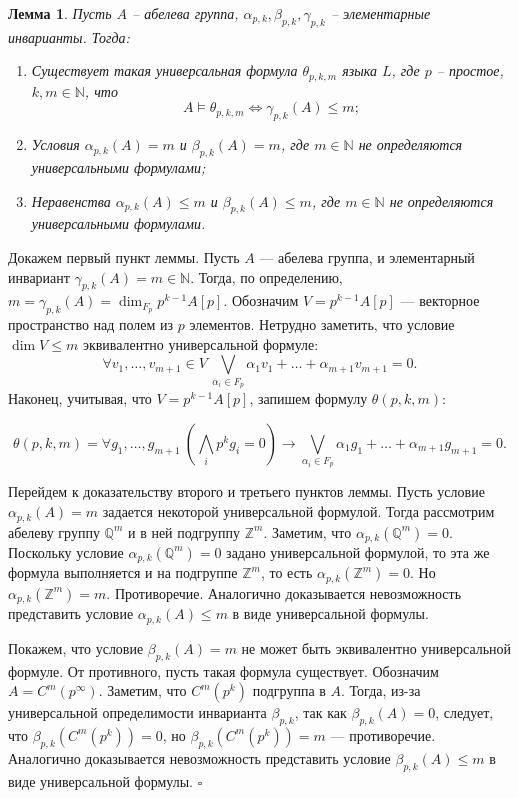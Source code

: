 \documentclass[a4paper,11pt,twoside]{article}
\newtheorem{lemma}{Лемма}[section]
\def\proof{{\noindent{\bf Доказательство.}} }
\def\Z{{\mathbb{Z}}}
\def\N{{\mathbb{N}}}
\def\Q{{\mathbb{Q}}}
\begin{document}
\begin{lemma}\label{lemma:gamma}
Пусть $A$ -- абелева группа, $\alpha_{p,k}, \beta_{p,k}, \gamma_{p,k}$ -- элементарные инварианты. Тогда:
\begin{enumerate}
\item Существует такая универсальная формула $\theta_{p,k,m}$ языка $L$, где $p$ -- простое, $k,m \in \N$, что 
$$A \models \theta_{p,k,m} \Leftrightarrow \gamma_{p,k}(A) \leq m;$$
\item Условия $\alpha_{p,k}(A) = m$ и $\beta_{p,k}(A) = m$, где $m \in \N$ не определяются универсальными формулами;
\item Неравенства $\alpha_{p,k}(A) \leq m$ и $\beta_{p,k}(A) \leq m$, где $m \in \N$ не определяются универсальными формулами.
\end{enumerate}
\end{lemma}
\proof Докажем первый пункт леммы. Пусть $A$ --- абелева группа, и элементарный инвариант $\gamma_{p,k}(A) = m \in \N$. Тогда, по определению, $m = \gamma_{p,k} (A) = \dim_{F_p} p^{k-1} A[p]$. Обозначим $V = p^{k-1} A[p]$ --- векторное пространство над полем из $p$ элементов. Нетрудно заметить, что условие $\dim V \leq m$ эквивалентно универсальной формуле: 
$$\forall v_1, \ldots, v_{m+1} \in V \ \bigvee_{\alpha_i \in F_p} \alpha_1v_1 + \ldots + \alpha_{m+1}v_{m+1} = 0.$$
Наконец, учитывая, что $V = p^{k-1}A[p]$, запишем формулу $\theta(p,k,m)$:

$$
\theta(p,k,m) = \forall g_1, \ldots, g_{m+1} \ (\bigwedge_i p^{k}g_{i} = 0) \rightarrow  \bigvee_{\alpha_i \in F_p} \alpha_1g_1 + \ldots + \alpha_{m+1}g_{m+1} = 0.
$$


Перейдем к доказательству второго и третьего пунктов леммы. Пусть условие $\alpha_{p,k}(A) = m$ задается некоторой универсальной формулой. Тогда рассмотрим абелеву группу $\Q^m$ и в ней подгруппу $\Z^m$. Заметим, что $\alpha_{p,k}(\Q^m) = 0$. Поскольку условие $\alpha_{p,k}(\Q^m) = 0$ задано универсальной формулой, то эта же формула выполняется и на подгруппе $\Z^m$, то есть $\alpha_{p,k}(\Z^m) = 0$. Но $\alpha_{p,k}(\Z^m) = m$. Противоречие. Аналогично доказывается невозможность представить условие $\alpha_{p,k}(A) \leq m$ в виде универсальной формулы.

Покажем, что условие $\beta_{p,k}(A) = m$ не может быть эквивалентно универсальной формуле. От противного, пусть такая формула существует.  Обозначим $A = C^{m}(p^{\infty})$. Заметим, что $C^{m}(p^k)$ подгруппа в $A$. Тогда, из-за универсальной определимости инварианта $\beta_{p,k}$, так как $\beta_{p,k} (A) = 0$, следует, что $\beta_{p,k} (C^{m}(p^k)) = 0$, но $\beta_{p,k} (C^{m}(p^k)) = m$ --- противоречие. 
Аналогично доказывается невозможность представить условие $\beta_{p,k}(A) \leq m$ в виде универсальной формулы. $\square$
\end{document}
